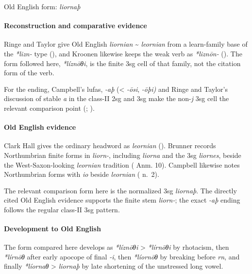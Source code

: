 \documentclass[
  british,
  a4paper,
]{article}
\begin{document}
Old English form: \emph{liornaþ}

\paragraph{Reconstruction and comparative
evidence}\label{reconstruction-and-comparative-evidence-62}

Ringe and Taylor give Old English \emph{liornian} \textasciitilde{}
\emph{leornian} from a learn-family base of the \emph{*lizn-} type
(), and Kroonen
likewise keeps the weak verb as \emph{*liznōn-}
(). The form followed here,
\emph{*líznōθi}, is the finite 3sg cell of that family, not the citation
form of the verb.

For the ending, Campbell's lufas, \emph{-aþ} (\textless{} \emph{-ōsi},
\emph{-ōþi)} and Ringe and Taylor's discussion of stable \emph{a} in the
class-II 2sg and 3sg make the non-\emph{j} 3sg cell the relevant
comparison point (; ).

\paragraph{Old English evidence}\label{old-english-evidence-62}

Clark Hall gives the ordinary headword as \emph{leornian}
(). Brunner records
Northumbrian finite forms in \emph{liorn-}, including \emph{liorna} and
the 3sg \emph{liornes}, beside the West-Saxon-looking \emph{leornian}
tradition (
Anm. 10). Campbell likewise notes Northumbrian forms with \emph{io}
beside \emph{leornian} ( n.~2).

The relevant comparison form here is the normalized 3sg \emph{liornaþ}.
The directly cited Old English evidence supports the finite stem
\emph{liorn-}; the exact \emph{-aþ} ending follows the regular class-II
3sg pattern.

\paragraph{Development to Old
English}\label{development-to-old-english-62}

The form compared here develops as \emph{*líznōθi} \textgreater{}
\emph{*lírnōθi} by rhotacism, then \emph{*lírnōθ} after early apocope of
final \emph{-i}, then \emph{*líornōθ} by breaking before \emph{rn}, and
finally \emph{*líornaθ} \textgreater{} \emph{liornaþ} by late shortening
of the unstressed long vowel.
\end{document}
